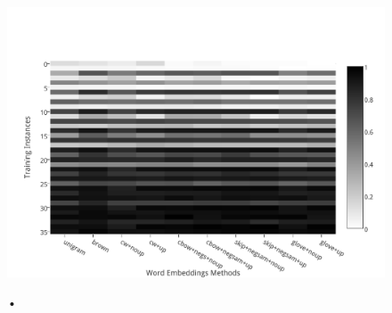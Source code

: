 \begin{figure}
\caption{•}
\centering
\includegraphics[scale=0.8]{plots/heat-map}    	
\label{fig:heatmap}
\end{figure}



